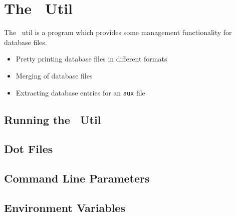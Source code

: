 

\section{The \ExBib\ Util}

The \ExBib\ util is a program which provides some management
functionality for database files. 

\begin{itemize}
\item Pretty printing database files in different formats
\item Merging of database files
\item Extracting database entries for an \texttt{aux} file
\end{itemize}


\subsection{Running the \ExBib\ Util}

\INCOMPLETE


\subsection{Dot Files}%

\INCOMPLETE


\subsection{Command Line Parameters}


\INCOMPLETE


\subsection{Environment Variables}


\INCOMPLETE



\endinput
%
